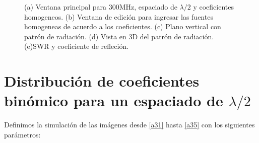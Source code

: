 \documentclass[11pt]{book}
\begin{document}
\begin{figure}[h]
	\caption{(a) Ventana principal para 300MHz, espaciado de $\lambda / 2$ y coeficientes homogeneos. (b) Ventana de edición para ingresar las fuentes homogeneas de acuerdo a los coeficientes. (c) Plano vertical con patrón de radiación. (d) Vista en 3D del patrón de radiación. (e)SWR y coeficiente de refleción.}
\end{figure}


\newpage
\section{Distribución de coeficientes binómico para un espaciado de $\lambda/2$}

Definimos la simulación de las imágenes desde \eqref{a31} hasta \eqref{a35} con los siguientes parámetros:
\end{document}
